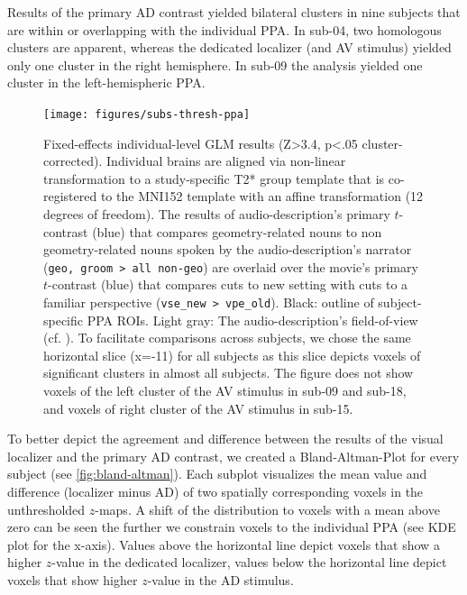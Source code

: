 \documentclass[english]{article}
\begin{document}
Results of the primary AD contrast yielded bilateral clusters in nine subjects
that are within or overlapping with the individual PPA.
In sub-04, two homologous clusters are apparent, whereas the dedicated localizer
(and AV stimulus) yielded only one cluster in the right hemisphere.
In sub-09 the analysis yielded one cluster in the left-hemispheric PPA.


\begin{figure}[h!]
\centering
    \texttt{[image: figures/subs-thresh-ppa]}
    \caption{Fixed-effects individual-level GLM results (Z>3.4, p<.05
        cluster-corrected).
        Individual brains are aligned via non-linear
        transformation to a study-specific T2* group template that is
        co-registered to the MNI152 template with an affine transformation (12
        degrees of freedom).
        The results of audio-description's primary
        $t$-contrast (blue) that compares geometry-related nouns to non
        geometry-related nouns spoken by the audio-description's narrator
        (\texttt{geo, groom > all non-geo}) are overlaid over the movie's
        primary $t$-contrast (blue) that compares cuts to new setting with cuts
        to a familiar perspective (\texttt{vse\_new > vpe\_old}).
        Black:
        outline of subject-specific PPA ROIs.
        Light gray: The
        audio-description's field-of-view (cf. \citep{hanke2014audiomovie}).
        To facilitate comparisons across subjects, we chose the same horizontal
        slice (x=-11) for all subjects as this slice depicts voxels of
        significant clusters in almost all subjects.
        The figure does not show voxels of the left cluster of the AV stimulus
        in sub-09 and sub-18, and voxels of right cluster of the AV stimulus in
        sub-15.}
    \label{fig:subs-thresh-ppa}
\end{figure}

To better depict the agreement and difference between the results of the visual
localizer and the primary AD contrast, we created a Bland-Altman-Plot for every
subject (see \ref{fig:bland-altman}).
Each subplot visualizes the mean value and difference (localizer minus AD) of
two spatially corresponding voxels in the unthresholded $z$-maps.
A shift of the distribution to voxels with a mean above zero can be seen the
further we constrain voxels to the individual PPA (see KDE plot for the x-axis).
Values above the horizontal line depict voxels that show a higher $z$-value in
the dedicated localizer, values below the horizontal line depict voxels that
show higher $z$-value in the AD stimulus.
\end{document}
